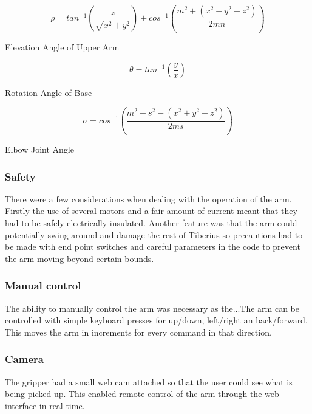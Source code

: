 \begin{capequ}[!htb]
\begin{center}
\begin{equation}
\rho = tan^{-1}\left ( \frac{z}{\sqrt{{x^{2}+y^{2}}}} \right )+ cos^{-1}\left ( \frac{m^{2}+(x^{2}+y^{2}+z^{2})}{2mn} \right )
\end{equation}
\caption{Elevation Angle of Upper Arm}
\label{Equation3}
\end{center}
\end{capequ}

\begin{capequ}[!htb]
\begin{center}
\begin{equation}
\theta = tan^{-1}\left (  \frac{y}{x}\right )
\end{equation}
\caption{Rotation Angle of Base}
\label{Equation4}
\end{center}
\end{capequ}

\begin{capequ}[!htb]
\begin{center}
\begin{equation}
\sigma = cos^{-1}\left (\frac{m^{2}+s^{2}-(x^{2}+y^{2}+z^{2})}{2ms} \right )
\end{equation}
\caption{Elbow Joint Angle}
\label{Equation5}
\end{center}
\end{capequ}

\subsubsection{Safety}
There were a few considerations when dealing with the operation of the arm.  Firstly the use of several motors and a fair amount of current meant that they had to be safely electrically insulated.
Another feature was that the arm could potentially swing around and damage the rest of Tiberius so precautions had to be made with end point switches and careful parameters in the code to prevent the arm moving beyond certain bounds.

\subsubsection{Manual control}
The ability to manually control the arm was necessary as the...The arm can be controlled with simple keyboard presses for up/down, left/right an back/forward.
This moves the arm in increments for every command in that direction.

\subsubsection{Camera}
The gripper had a small web cam attached so that the user could see what is being picked up.
This enabled remote control of the arm through the web interface in real time.
